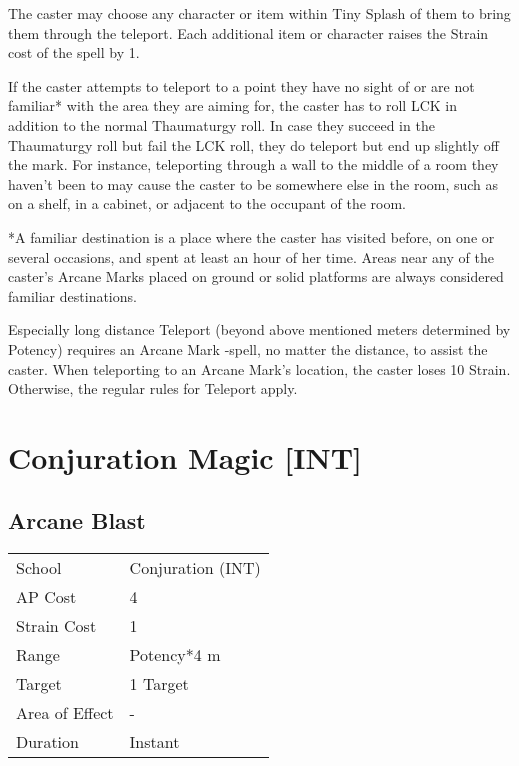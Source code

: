 \documentclass[11pt,a4paper,twocolumn]{book}
\begin{document}
The caster may choose any character or item within Tiny Splash of them to bring them through the teleport. Each additional item or character raises the Strain cost of the spell by 1.

If the caster attempts to teleport to a point they have no sight of or are not familiar* with the area they are aiming for, the caster has to roll LCK in addition to the normal Thaumaturgy roll. In case they succeed in the Thaumaturgy roll but fail the LCK roll, they do teleport but end up slightly off the mark. For instance, teleporting through a wall to the middle of a room they haven't been to may cause the caster to be somewhere else in the room, such as on a shelf, in a cabinet, or adjacent to the occupant of the room.

\medskip

*A familiar destination is a place where the caster has visited before, on one or several occasions, and spent at least an hour of her time. Areas near any of the caster's Arcane Marks placed on ground or solid platforms are always considered familiar destinations.

Especially long distance Teleport (beyond above mentioned meters determined by Potency) requires an Arcane Mark -spell, no matter the distance, to assist the caster. When teleporting to an Arcane Mark's location, the caster loses 10 Strain. Otherwise, the regular rules for Teleport apply.

\bigskip

\section*{Conjuration Magic [INT]}

\subsection*{Arcane Blast}
{
	\begin{tabu} to 75mm{| X[l,4] | X[l,7] |}
		\hline
		School 			& Conjuration (INT) \\
		AP Cost	      	& 4 				\\
		Strain Cost     & 1 				\\
		Range     		& Potency*4 m 		\\
		Target      	& 1 Target 			\\
		Area of Effect  & - 	 			\\
		Duration     	& Instant 			\\ \hline
	\end{tabu}
	
}
\end{document}
